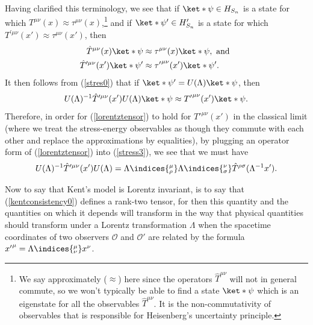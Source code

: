 \documentclass[12pt]{report}
\begin{document}
Having clarified this terminology, we see that if $\ket*{\psi}\in H_{S_n}$ is a state for which $T^{\mu\nu}(x)\approx \tau^{\mu\nu}(x)$,\footnote{We say approximately ($\approx$) here since the operators $\hat{T}^{\mu\nu}$ will not in general commute, so we won't typically be able to find a state $\ket*{\psi}$ which is an eigenstate for all the observables $\hat{T}^{\mu\nu}$. It is the non-commutativity of observables that is responsible for Heisenberg's uncertainty principle.} and if $\ket*{\psi'}\in H_{S_n}'$ is a state for which $T^{\prime\mu\nu}(x')\approx \tau^{\mu\nu}(x')$, then
\begin{subequations}\label{stres0}
\begin{align}
\hat{T}^{\mu\nu}(x)\ket*{\psi}&\approx\tau^{\mu\nu}(x)\ket*{\psi}, \text{ and }\label{stres1}\\ 
\hat{T}^{\prime\mu\nu}(x')\ket*{\psi'}&\approx{\tau'}^{\mu\nu}(x')\ket*{\psi'}.\label{stres2}
\end{align}
\end{subequations}
It then follows from (\ref{stres0}) that if $\ket*{\psi'}=U(\Lambda)\ket*{\psi}$, then
\begin{equation}\label{stress3}
    U(\Lambda)^{-1}\hat{T}^{\prime\mu\nu}(x')U(\Lambda)\ket*{\psi}\approx{T'}^{\mu\nu}(x')\ket*{\psi}.
\end{equation}
Therefore, in order for (\ref{lorentztensor}) to hold for ${T'}^{\mu\nu}(x')$ in the classical limit (where we treat the stress-energy observables as though they commute with each other and replace the approximations by equalities), by plugging an operator form of  (\ref{lorentztensor}) into (\ref{stress3}), we see that we must have
\begin{equation}\label{TUrelation}
U(\Lambda)^{-1}\hat{T}^{\prime\mu\nu}(x')U(\Lambda)=\Lambda\indices{^\mu_\rho}\Lambda\indices{^\nu_\sigma}\hat{T}^{\rho\sigma}(\Lambda^{-1}x').
\end{equation}



Now to say that Kent's model is Lorentz invariant, is to say that (\ref{kentconsistency0}) defines a rank-two tensor, for then this quantity and the quantities on which it depends will transform in the way that physical quantities should transform under a Lorentz transformation $\Lambda$ when the spacetime coordinates of two observers $\mathcal{O}$ and $\mathcal{O}'$ are related by the formula ${x'}^\mu=\Lambda\indices{^\mu_\nu}x^\nu$.
\end{document}
